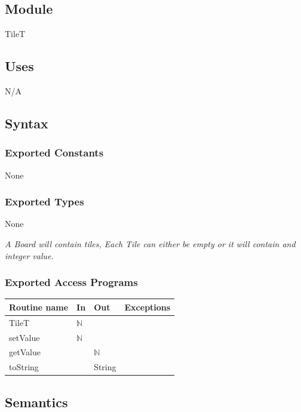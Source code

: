 \documentclass[12pt]{article}
\begin{document}
\subsection*{Module}

TileT

\subsection* {Uses}

N/A

\subsection* {Syntax}

\subsubsection* {Exported Constants}

None

\subsubsection* {Exported Types}

None

\medskip

\noindent \textit{A Board will contain tiles, Each Tile can either be empty or it will contain and integer value.}

\subsubsection* {Exported Access Programs}

\begin{tabular}{| l | l | l | p{6cm} |}
\hline
\textbf{Routine name} & \textbf{In} & \textbf{Out} & \textbf{Exceptions}\\
\hline
TileT & $\mathbb{N}$ & ~ & \\
\hline
setValue & $\mathbb{N}$ & ~ & \\
\hline
getValue & ~ & $\mathbb{N}$ & \\
\hline
toString & ~ & String & \\
\hline
\end{tabular}

\subsection* {Semantics}
\end{document}
